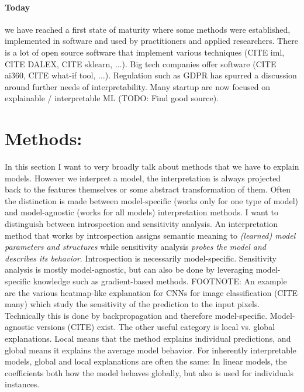 \documentclass[runningheads]{llncs}
\begin{document}
\paragraph{Today} we have reached a first state of maturity where some methods were established, implemented in software and used by practitioners and applied researchers.
There is a lot of open source software that implement various techniques (CITE iml, CITE DALEX, CITE sklearn, ...).
Big tech companies offer software (CITE ai360, CITE what-if tool, ...).
Regulation such as GDPR has spurred a discussion around further needs of interpretability.
Many startup are now focused on explainable / interpretable ML (TODO: Find good source).


\section{Methods:}

In this section I want to very broadly talk about methods that we have to explain models.
However we interpret a model, the interpretation is always projected back to the features themselves or some abstract transformation of them.
Often the distinction is made between model-specific (works only for one type of model) and model-agnostic (works for all models) interpretation methods.
I want to distinguish between introspection and sensitivity analysis.
An interpretation method that works by introspection assigns semantic meaning to \textit{(learned) model parameters and structures} while sensitivity analysis \textit{probes the model and describes its behavior}.
Introspection is necessarily model-specific.
Sensitivity analysis is mostly model-agnostic, but can also be done by leveraging model-specific knowledge such as gradient-based methods. FOOTNOTE: An example are the various heatmap-like explanation for CNNs for image classification (CITE many) which study the sensitivity of the prediction to the input pixels. Technically this is done by backpropagation and therefore model-specific. Model-agnostic versions (CITE) exist.
The other useful category is local vs. global explanations.
Local means that the method explains individual predictions, and global means it explains the average model behavior.
For inherently interpretable models, global and local explanations are often the same: In linear models, the coefficients both how the model behaves globally, but also is used for individuals instances.
\end{document}

